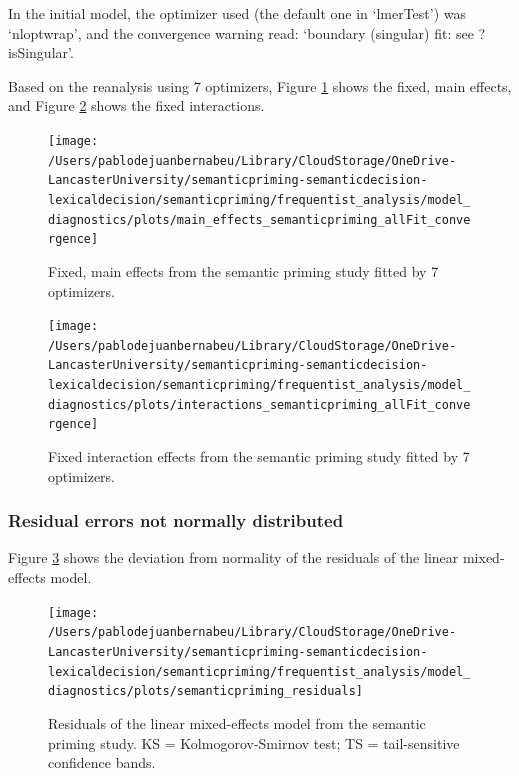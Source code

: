 \documentclass[
  12pt,
  man,floatsintext]{apa7}
\begin{document}
In the initial model, the optimizer used (the default one in `lmerTest') was `nloptwrap', and the convergence warning read: `boundary (singular) fit: see ?isSingular'.

Based on the reanalysis using 7 optimizers, Figure \ref{fig:main-effects-semanticpriming-allFit-convergence} shows the fixed, main effects, and Figure \ref{fig:interactions-semanticpriming-allFit-convergence} shows the fixed interactions.

\begin{figure}

{\centering \texttt{[image: /Users/pablodejuanbernabeu/Library/CloudStorage/OneDrive-LancasterUniversity/semanticpriming-semanticdecision-lexicaldecision/semanticpriming/frequentist\_analysis/model\_diagnostics/plots/main\_effects\_semanticpriming\_allFit\_convergence]} 

}

\caption{Fixed, main effects from the semantic priming study fitted by 7 optimizers.}\label{fig:main-effects-semanticpriming-allFit-convergence}
\end{figure}

\begin{figure}

{\centering \texttt{[image: /Users/pablodejuanbernabeu/Library/CloudStorage/OneDrive-LancasterUniversity/semanticpriming-semanticdecision-lexicaldecision/semanticpriming/frequentist\_analysis/model\_diagnostics/plots/interactions\_semanticpriming\_allFit\_convergence]} 

}

\caption{Fixed interaction effects from the semantic priming study fitted by 7 optimizers.}\label{fig:interactions-semanticpriming-allFit-convergence}
\end{figure}

\hypertarget{residual-errors-not-normally-distributed-1}{%
\subsubsection{Residual errors not normally distributed}\label{residual-errors-not-normally-distributed-1}}

Figure \ref{fig:semanticpriming-residuals} shows the deviation from normality of the residuals of the linear mixed-effects model.

\begin{figure}

{\centering \texttt{[image: /Users/pablodejuanbernabeu/Library/CloudStorage/OneDrive-LancasterUniversity/semanticpriming-semanticdecision-lexicaldecision/semanticpriming/frequentist\_analysis/model\_diagnostics/plots/semanticpriming\_residuals]} 

}

\caption{Residuals of the linear mixed-effects model from the semantic priming study. \linebreak KS = Kolmogorov-Smirnov test; TS = tail-sensitive confidence bands.}\label{fig:semanticpriming-residuals}
\end{figure}
\end{document}
